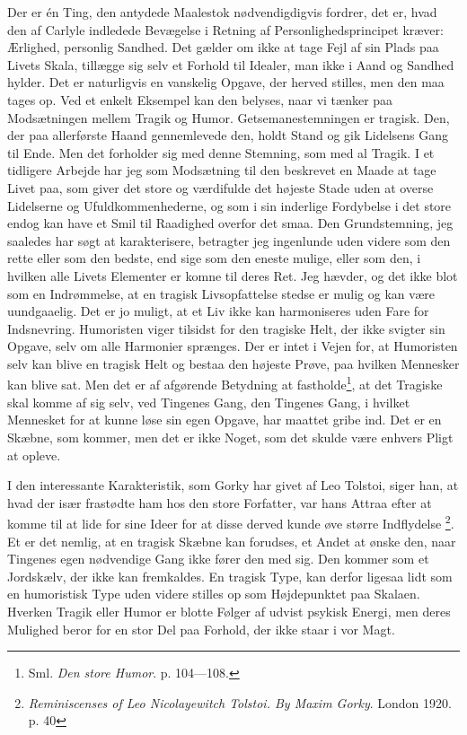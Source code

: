 \documentclass[12pt]{article}
\newcommand{\opage}[1]{\marginnote{\footnotesize\textit{[#1]}}}
\begin{document}
Der er én Ting, den antydede Maalestok
nødvendigdigvis fordrer, det er, hvad den af Carlyle indledede
Bevægelse i Retning af Personlighedsprincipet kræver: Ærlighed,
personlig Sandhed. Det gælder om ikke at tage Fejl af sin Plads paa
Livets Skala, tillægge sig selv et
\setcounter{footnote}{0}%
\opage{61}Forhold til Idealer, man ikke i Aand og Sandhed hylder. Det er
naturligvis en vanskelig Opgave, der herved stilles, men den maa tages
op. Ved et enkelt Eksempel kan den belyses, naar vi tænker paa
Modsætningen mellem Tragik og Humor. Getsemanestemningen er tragisk.
Den, der paa allerførste Haand gennemlevede den, holdt Stand og gik
Lidelsens Gang til Ende. Men det forholder sig med denne Stemning, som
med al Tragik. I et tidligere Arbejde har jeg som Modsætning til den
beskrevet en Maade at tage Livet paa, som giver det store og
værdifulde det højeste Stade uden at overse Lidelserne og
Ufuldkommenhederne, og som i sin inderlige Fordybelse i det store
endog kan have et Smil til Raadighed overfor det smaa. Den
Grundstemning, jeg saaledes har søgt at karakterisere, betragter jeg
ingenlunde uden videre som den \guillemotright{}rette\guillemotleft{} eller som den \guillemotright{}bedste\guillemotleft{},
end sige som den eneste mulige, eller som den, i hvilken alle Livets
Elementer er komne til deres Ret. Jeg hævder, og det ikke blot som en
Indrømmelse, at en tragisk Livsopfattelse stedse er mulig og kan være
uundgaaelig. Det er jo muligt, at et Liv ikke kan harmoniseres uden
Fare for Indsnevring. Humoristen viger tilsidst for den tragiske Helt,
der ikke svigter sin Opgave, selv om alle Harmonier sprænges. Der er
intet i Vejen for, at Humoristen selv kan blive en tragisk Helt og
bestaa den højeste Prøve, paa hvilken Mennesker kan blive sat. Men det
er af afgørende Betydning at fastholde\footnote{Sml. \textit{Den store
Humor}. p. 104---108.}, at det Tragiske skal komme \guillemotright{}af sig selv\guillemotleft{},
ved Tingenes Gang, den Tingenes Gang, i hvilket Mennesket for at kunne
løse sin egen Opgave, har maattet gribe ind. Det er en Skæbne, som
kommer, men det er ikke Noget, som det skulde være enhvers Pligt at
opleve.

\setcounter{footnote}{0}%
\opage{62}I den interessante Karakteristik, som Gorky har givet af Leo
Tolstoi, siger han, at hvad der især frastødte ham hos den store
Forfatter, var hans Attraa efter at komme til at lide for sine Ideer
for at disse derved kunde øve større Indflydelse%
\footnote{\textit{Reminiscenses of Leo Nicolayewitch Tolstoi. By Maxim
Gorky}. London 1920. p. 40}. Et er det nemlig, at en tragisk Skæbne
kan forudses, et Andet at ønske den, naar Tingenes egen nødvendige Gang
ikke fører den med sig. Den kommer som et Jordskælv, der ikke kan
fremkaldes. En tragisk Type, kan derfor ligesaa lidt som en
humoristisk Type uden videre stilles op som Højdepunktet paa Skalaen.
Hverken Tragik eller Humor er blotte Følger af udvist psykisk Energi,
men deres Mulighed beror for en stor Del paa Forhold, der ikke staar i
vor Magt.
\end{document}

